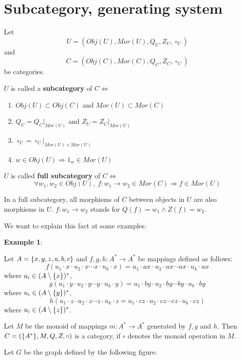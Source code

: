 \section{Subcategory, generating system}

\begin{definition}
Let \[ U = (Obj(U), Mor(U), Q_U, Z_U, \circ_U) \] and \[C = (Obj(C), Mor(C),
Q_C, Z_C, \circ_C)\] be categories.

$U$ is called a {\bf subcategory} of $C \iff$
\begin{enumerate}
  \item $Obj(U) \subset Obj(C)$ and $Mor(U) \subset Mor(C)$
  \item $Q_U = Q_C|_{Mor(U)}$ and $Z_U = Z_C|_{Mor(U)}$
  \item $\circ_U = \circ_C|_{Mor(U) \times Mor(U)}$
  \item $w \in Obj(U) \Rightarrow 1_w \in Mor(U)$
\end{enumerate}
\end{definition}

$U$ is called {\bf full subcategory} of $C \iff$
\[ \forall w_1, w_2 \in Obj(U),\ f: w_1 \to w_2 \in Mor(C) \Rightarrow f \in
Mor(U) \]

In a full subcategory, all morphisms of $C$ between objects in $U$ are also
morphisms in $U$. $f: w_1 \to w_2$ stands for $Q(f) = w_1 \wedge Z(f) = w_2$.

We want to explain this fact at some examples:

\bigskip
{\bf Example 1}:

Let $A = \mbox{$\{x,y,z,a,b,c\}$}$ and $f, g, h: A^* \to A^*$ be mappings defined
as follows:
\[ f(u_1 \cdot x \cdot u_2 \cdot x \cdots x \cdot u_k \cdot x) = 
u_1 \cdot ax \cdot u_2 \cdot ax \cdots ax \cdot u_k \cdot ax \]
where $u_i \in (A \setminus \mbox{$\{x\}$})^*$,
\[ g(u_1 \cdot y \cdot u_2 \cdot y \cdots y \cdot u_k \cdot y) = 
u_1 \cdot by \cdot u_2 \cdot by \cdots by \cdot u_k \cdot by \]
where $u_i \in (A \setminus \mbox{$\{y\}$})^*$,
\[ h(u_1 \cdot z \cdot u_2 \cdot z \cdots z \cdot u_k \cdot z = 
u_1 \cdot cz \cdot u_2 \cdot cz \cdots cz \cdot u_k \cdot cz) \]
where $u_i \in (A \setminus \mbox{$\{z\}$})^*$.

Let $M$ be the monoid of mappings $m: A^* \to A^*$ generated by $f, g$ and $h$.
Then $C = (\mbox{$\{A^*\}$}, M, Q, Z, \circ)$ is a category, if $\circ$ denotes the
monoid operation in $M$.

Let $G$ be the graph defined by the following figure:

\begin{center}

\end{center}

